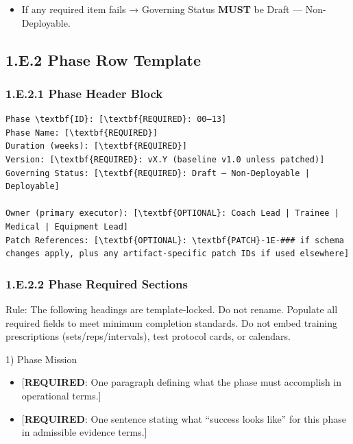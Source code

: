 \documentclass[10pt]{article}
\begin{document}
\begin{itemize}
\item If any required item fails → Governing Status \textbf{MUST} be Draft — Non-Deployable.
\end{itemize}

\newpage
\subsection*{1.E.2 Phase Row Template}
{}

\subsubsection*{1.E.2.1 Phase Header Block}

\begin{verbatim}
Phase \textbf{ID}: [\textbf{REQUIRED}: 00–13]
Phase Name: [\textbf{REQUIRED}]
Duration (weeks): [\textbf{REQUIRED}]
Version: [\textbf{REQUIRED}: vX.Y (baseline v1.0 unless patched)]
Governing Status: [\textbf{REQUIRED}: Draft — Non-Deployable | Deployable]

Owner (primary executor): [\textbf{OPTIONAL}: Coach Lead | Trainee | Medical | Equipment Lead]
Patch References: [\textbf{OPTIONAL}: \textbf{PATCH}-1E-### if schema changes apply, plus any artifact-specific patch IDs if used elsewhere]
\end{verbatim}

\subsubsection*{1.E.2.2 Phase Required Sections}

Rule: The following headings are template-locked. Do not rename. Populate all required fields to meet minimum completion standards. Do not embed training prescriptions (sets/reps/intervals), test protocol cards, or calendars.

1) Phase Mission

\begin{itemize}
\item {[\textbf{REQUIRED}: One paragraph defining what the phase must accomplish in operational terms.]}
\item {[\textbf{REQUIRED}: One sentence stating what “success looks like” for this phase in admissible evidence terms.]}
\end{itemize}
\end{document}
